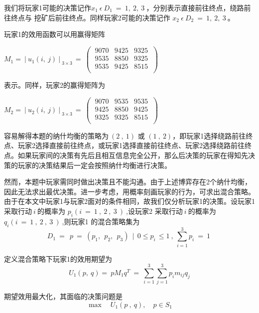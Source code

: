 \documentclass[bwprint]{cumcmthesis} %
\begin{document}
我们将玩家1可能的决策记作$ x_1\ \epsilon\ D_1\ =\ {1,\ 2,\ 3\ } $，分别表示直接前往终点，绕路前往终点与
挖矿后前往终点。同样玩家2可能的决策记作 $x_2\ \epsilon\ D_2\ =\ {1,\ 2,\ 3\ }$。

玩家1的效用函数可以用赢得矩阵
\begin{center}
    $ M_1={\ |\ u_1(i,\ j)\ |\ }_{3\times3\ }=\ \left(\ \begin{matrix}9070&9425&9325\\9535&8850&9325\\9535&9425&8515\\\end{matrix}\ \right) $
\end{center} 
表示。同样，玩家2的赢得矩阵为
\begin{center}
    $ M_2={\ |\ u_2(i,\ j)\ |\ }_{3\times3\ }=\ \left(\ \begin{matrix}9070&9535&9535\\9425&8850&9425\\9325&9325&8515\\\end{matrix}\ \right) $
\end{center}

容易解得本题的纳什均衡的策略为$\ (2\ ,\ 1)$ 或 $(1\ ,\ 2)$，即玩家1选择绕路前往终点、玩家2选择直接前往终点，或玩家1选择直接前往终点、玩家2选择绕路前往终点。如果玩家间的决策有先后且相互信息完全公开，那么后决策的玩家在得知先决策的玩家的决策结果后一定会按照纳什均衡进行决策。

然而，本题中玩家需同时做出决策且不能沟通。由于上述博弈存在2个纳什均衡，因此无法求出最优决策。进一步考虑，用概率刻画玩家的行为，可求出混合策略。由于在本文中玩家1与玩家2面对的条件相同，故我们仅分析玩家1的决策。设玩家1采取行动$ \ i\ $的概率为 $ p_i(i\ =\ 1\ ,\ 2\ ,\ 3\ )\ $,设玩家2
采取行动$ \ i\ $的概率为 $ q_i(i\ =\ 1\ ,\ 2\ ,\ 3\ )\ $,则玩家1
的混合策略集为
\begin{equation}
    D_1\ =\ {\ p\ =\ (p_1,\ {\ p}_2,\ {\ p}_3)\ \ |\ \ 0\le p_{i\ }\le1\ ,\ \sum_{i=1}^{3}p_i\ =\ 1\ } 
\end{equation}

定义混合策略下玩家1的效用期望为
\begin{equation}
    U_1(p,\ q)=\ pM_1q^T\ =\ \sum_{i=1}^{3}\sum_{j=1}^{3}{p_im_{ij}q_j}
\end{equation}

期望效用最大化，其面临的决策问题是
\begin{equation}
     \max \quad  {U_1(p\ ,\ q)},  \quad {p\in S_1}
\end{equation}
\end{document}
